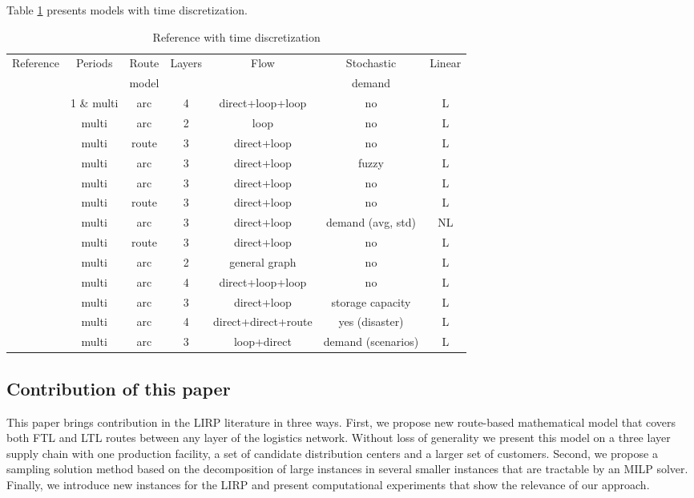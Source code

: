 \documentclass[a4paper,10pt]{article}
\begin{document}
\begin{linenumbers}
Table \ref{tab2} presents models with time discretization. 

\begin{table}[htbp]
	\scriptsize
	\begin{tabular}{lcccccc}
		\toprule
		Reference & Periods & Route & Layers   & Flow &  Stochastic & Linear  \\
					&          & model & 	   & 	   &     demand        &                      \\
		\midrule
\cite{AmbScu05}			&	1 \& multi	&	arc		&	4 	&	direct+loop+loop	&	no	&	L		\\
\cite{Zhang2014}		&	multi		&	arc  	&	2 	&	loop				&	no	&	L	\\
\cite{Guerrero2013}		&	multi		&	route	&	3 	&	direct+loop			&	no	&	L	\\
\cite{TavakkoliIFAC2016}&	multi		&	arc		&	3 	&	direct+loop			&	fuzzy 	&	L	\\
\cite{Ghorbani2016}		&	multi		&	arc		&	3 	&	direct+loop			&	no	&	L\\
\cite{Lehrlaly2016}		&	multi		&	route	&	3 	&	direct+loop			&	no	&	L		\\
\cite{Rayat2017}		&	multi		&	arc		&	3 	&	direct+loop			&	demand (avg, std)	&	NL		\\
\cite{Hiassat2017}		&	multi		&	route	&	3 	&	direct+loop			&	no	&	L		\\
\cite{Riquelme2016}		&	multi		&	arc		&	2 	&	general graph		&	no	&	L	\\
\cite{Tavana2018} 		&	multi		&	arc		&	4 	&	direct+loop+loop 	&	no	&	L		\\
\cite{Vahdani2018}		&	multi		&	arc		&	3 	&	direct+loop			&	storage capacity	&	L	\\
\cite{Eskandari2018}	&	multi		&	arc		&	4 	&	direct+direct+route	&	yes (disaster)	&	L		\\
\cite{Bashiri2018}		&	multi		&	arc		&	3 	&	loop+direct			&	demand (scenarios)	&	L	\\
		\bottomrule
	\end{tabular}
	\caption{Reference with time discretization}
	\label{tab2}
\end{table}




\subsection{Contribution of this paper}

This paper brings contribution in the LIRP literature in three ways. First, we propose new route-based mathematical model that covers both FTL and LTL routes between any layer of the logistics network. Without loss of generality we present this model on a three layer supply chain with one production facility, a set of candidate distribution centers and a larger set of customers. 
Second, we propose a sampling solution method based on the decomposition of large instances in several smaller instances that are tractable by an MILP solver. 
Finally, we introduce new instances for the LIRP and present computational experiments that show the relevance of our approach. 



\end{linenumbers}
\end{document}
